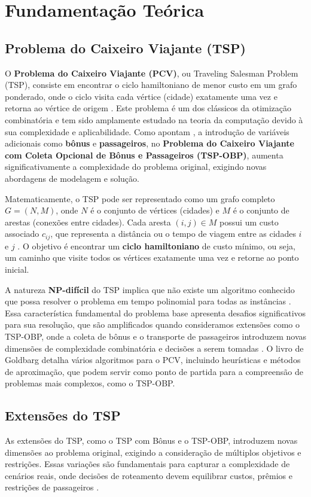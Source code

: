 \documentclass[12pt, a4paper]{report}
\begin{document}
\chapter{Fundamentação Teórica}

\section{Problema do Caixeiro Viajante (TSP)}
O \textbf{Problema do Caixeiro Viajante (PCV)}, ou Traveling Salesman Problem (TSP), consiste em encontrar o ciclo hamiltoniano de menor custo em um grafo ponderado, onde o ciclo visita cada vértice (cidade) exatamente uma vez e retorna ao vértice de origem \cite{goldbarg2012}. Este problema é um dos clássicos da otimização combinatória e tem sido amplamente estudado na teoria da computação devido à sua complexidade e aplicabilidade. Como apontam \cite{goldbarg2012, lopesfilho2019}, a introdução de variáveis adicionais como \textbf{bônus} e \textbf{passageiros}, no \textbf{Problema do Caixeiro Viajante com Coleta Opcional de Bônus e Passageiros (TSP-OBP)}, aumenta significativamente a complexidade do problema original, exigindo novas abordagens de modelagem e solução.

Matematicamente, o TSP pode ser representado como um grafo completo $G = (N, M)$, onde $N$ é o conjunto de vértices (cidades) e $M$ é o conjunto de arestas (conexões entre cidades). Cada aresta $(i, j) \in M$ possui um custo associado $c_{ij}$, que representa a distância ou o tempo de viagem entre as cidades $i$ e $j$ \cite{goldbarg2012}. O objetivo é encontrar um \textbf{ciclo hamiltoniano} de custo mínimo, ou seja, um caminho que visite todos os vértices exatamente uma vez e retorne ao ponto inicial. 

A natureza \textbf{NP-difícil} do TSP implica que não existe um algoritmo conhecido que possa resolver o problema em tempo polinomial para todas as instâncias \cite{goldbarg2012, carnielli}.  Essa característica fundamental do problema base apresenta desafios significativos para sua resolução, que são amplificados quando consideramos extensões como o TSP-OBP, onde a coleta de bônus e o transporte de passageiros introduzem novas dimensões de complexidade combinatória e decisões a serem tomadas \cite{lopesfilho2019, carvalho2022}. O livro de Goldbarg detalha vários algoritmos para o PCV, incluindo heurísticas e métodos de aproximação, que podem servir como ponto de partida para a compreensão de problemas mais complexos, como o TSP-OBP.

\section{Extensões do TSP}
As extensões do TSP, como o TSP com Bônus e o TSP-OBP, introduzem novas dimensões ao problema original, exigindo a consideração de múltiplos objetivos e restrições. Essas variações são fundamentais para capturar a complexidade de cenários reais, onde decisões de roteamento devem equilibrar custos, prêmios e restrições de passageiros \cite{carvalho2022}.
\end{document}
